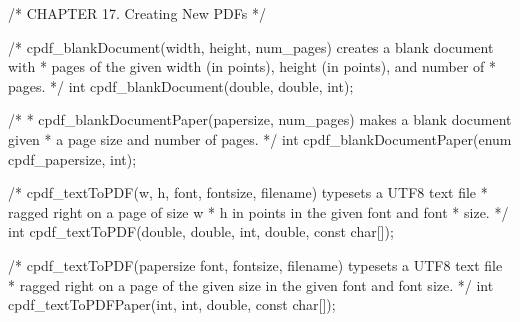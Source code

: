 /* CHAPTER 17. Creating New PDFs */

/* cpdf_blankDocument(width, height, num_pages) creates a blank document with
 * pages of the given width (in points), height (in points), and number of
 * pages.
 */
int cpdf_blankDocument(double, double, int);

/*
 * cpdf_blankDocumentPaper(papersize, num_pages) makes a blank document given
 * a page size and number of pages.
 */
int cpdf_blankDocumentPaper(enum cpdf_papersize, int);

/* cpdf_textToPDF(w, h, font, fontsize, filename) typesets a UTF8 text file
 * ragged right on a page of size w * h in points in the given font and font
 * size. */
int cpdf_textToPDF(double, double, int, double, const char[]);

/* cpdf_textToPDF(papersize font, fontsize, filename) typesets a UTF8 text file
 * ragged right on a page of the given size in the given font and font size. */
int cpdf_textToPDFPaper(int, int, double, const char[]);

